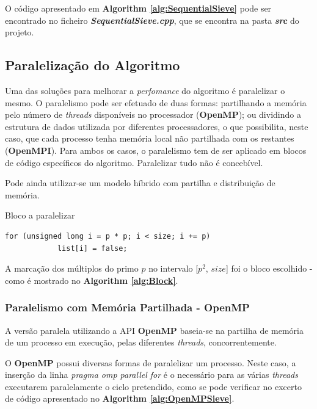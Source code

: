 \documentclass[a4paper]{article}
\begin{document}
O código apresentado em \textbf{Algorithm \ref{alg:SequentialSieve}} pode ser encontrado no ficheiro \textbf{\textit{SequentialSieve.cpp}}, que se encontra na pasta \textbf{\textit{src}} do projeto.
 
\subsection{Paralelização do Algoritmo}
 
Uma das soluções para melhorar a \textit{perfomance} do algoritmo é paralelizar o mesmo. O paralelismo pode ser efetuado de duas formas: partilhando a memória pelo número de \textit{threads} disponíveis no processador (\textbf{OpenMP}); ou dividindo a estrutura de dados utilizada por diferentes processadores, o que possibilita, neste caso, que cada processo tenha memória local não partilhada com os restantes (\textbf{OpenMPI}).
Para ambos os casos, o paralelismo tem de ser aplicado em blocos de código específicos do algoritmo. Paralelizar tudo não é concebível.

Pode ainda utilizar-se um modelo híbrido com partilha e distribuição de memória.

\begin{algorithm}
\caption{Bloco a paralelizar}
\label{alg:Block}
\begin{lstlisting}
for (unsigned long i = p * p; i < size; i += p)
			list[i] = false;
\end{lstlisting}
\end{algorithm}

A marcação dos múltiplos do primo $p$ no intervalo [$p^2$, $size$] foi o bloco escolhido - como é mostrado no \textbf{Algorithm \ref{alg:Block}}.

\subsubsection{Paralelismo com Memória Partilhada - OpenMP}

A versão paralela utilizando a API \textbf{OpenMP} baseia-se na partilha de memória de um processo em execução, pelas diferentes \textit{threads}, concorrentemente.

O \textbf{OpenMP} possui diversas formas de paralelizar um processo. Neste caso, a inserção da linha \textit{pragma omp parallel for} é o necessário para as várias \textit{threads} executarem paralelamente o ciclo pretendido, como se pode verificar no excerto de código apresentado no \textbf{Algorithm \ref{alg:OpenMPSieve}}.
\end{document}
